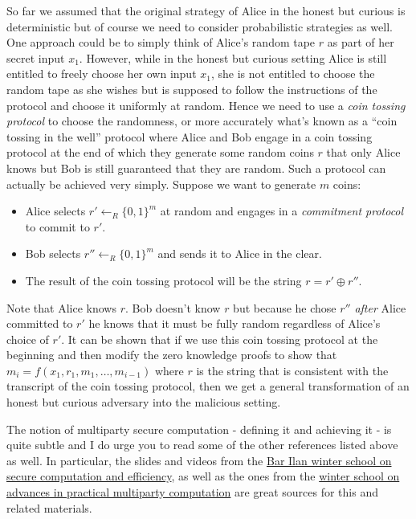 So far we assumed that the original strategy of Alice in the honest but
curious is deterministic but of course we need to consider probabilistic
strategies as well. One approach could be to simply think of Alice's
random tape \(r\) as part of her secret input \(x_1\). However, while in
the honest but curious setting Alice is still entitled to freely choose
her own input \(x_1\), she is not entitled to choose the random tape as
she wishes but is supposed to follow the instructions of the protocol
and choose it uniformly at random. Hence we need to use a \emph{coin
tossing protocol} to choose the randomness, or more accurately what's
known as a ``coin tossing in the well'' protocol where Alice and Bob
engage in a coin tossing protocol at the end of which they generate some
random coins \(r\) that only Alice knows but Bob is still guaranteed
that they are random. Such a protocol can actually be achieved very
simply. Suppose we want to generate \(m\) coins:

\begin{itemize}
\tightlist
\item
  Alice selects \(r'\leftarrow_R\{0,1\}^m\) at random and engages in a
  \emph{commitment protocol} to commit to \(r'\).
\item
  Bob selects \(r'' \leftarrow_R\{0,1\}^m\) and sends it to Alice in the
  clear.
\item
  The result of the coin tossing protocol will be the string
  \(r=r'\oplus r''\).
\end{itemize}

Note that Alice knows \(r\). Bob doesn't know \(r\) but because he chose
\(r''\) \emph{after} Alice committed to \(r'\) he knows that it must be
fully random regardless of Alice's choice of \(r'\). It can be shown
that if we use this coin tossing protocol at the beginning and then
modify the zero knowledge proofs to show that
\(m_i=f(x_1,r_1,m_1,\ldots,m_{i-1})\) where \(r\) is the string that is
consistent with the transcript of the coin tossing protocol, then we get
a general transformation of an honest but curious adversary into the
malicious setting.

The notion of multiparty secure computation - defining it and achieving
it - is quite subtle and I do urge you to read some of the other
references listed above as well. In particular, the slides and videos
from the
\href{https://cyber.biu.ac.il/event/the-1st-biu-winter-school/}{Bar Ilan
winter school on secure computation and efficiency}, as well as the ones
from the
\href{https://cyber.biu.ac.il/event/the-5th-biu-winter-school/}{winter
school on advances in practical multiparty computation} are great
sources for this and related materials.
